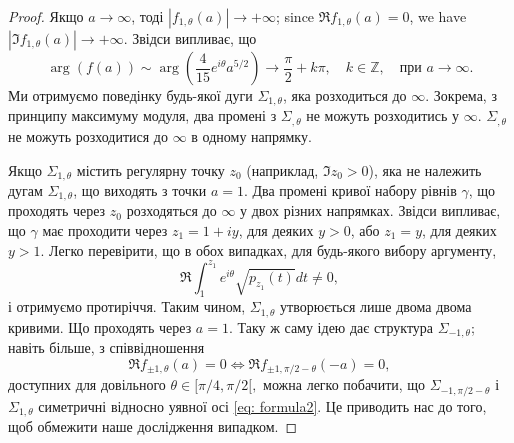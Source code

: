 \documentclass[]{article}
\theoremstyle{plain}
\begin{document}
\begin{proof}
Якщо $a \to \infty$, тоді $|f_{1,\theta}(a)| \to +\infty$; since $\Re f_{1,\theta}(a) = 0$, we have $|\Im f_{1,\theta}(a)| \to +\infty$. Звідси випливає, що
\begin{equation*}
    \arg(f(a)) \sim \arg \left( \frac{4}{15} e^{i\theta} a^{5/2} \right) \to \frac{\pi}{2} + k\pi, \quad k \in \mathbb{Z}, \quad \text{при } a \to \infty. 
\end{equation*}
Ми отримуємо поведінку будь-якої дуги $\Sigma_{1,\theta}$, яка розходиться до $\infty$. Зокрема, з принципу максимуму модуля, два промені з $\Sigma_{,\theta}$ не можуть розходитись у $\infty$. $\Sigma_{,\theta}$ не можуть розходитися до $\infty$ в одному напрямку. 

Якщо $\Sigma_{1,\theta}$ містить регулярну точку $z_0$ (наприклад, $\Im z_0 > 0$), яка не належить дугам $\Sigma_{1,\theta}$, що виходять з точки $a = 1$. Два промені кривої набору рівнів $\gamma$, що проходять через $z_0$ розходяться до $\infty$ у двох різних напрямках. Звідси випливає, що $\gamma$ має проходити через $z_1 = 1 + iy$, для деяких $y > 0$, або $z_1 = y$, для деяких $y > 1$. Легко перевірити, що в обох випадках, для будь-якого вибору аргументу,
\begin{equation*}
    \Re \int_{1}^{z_1} e^{i\theta} \sqrt{p_{z_1}(t)} dt \neq 0,
\end{equation*}
і отримуємо протиріччя. Таким чином, $\Sigma_{1,\theta}$ утворюється лише двома двома кривими. Що проходять через $a = 1$. Таку ж саму ідею дає структура  $\Sigma_{-1,\theta}$; навіть більше, з співвідношення
\begin{equation} \label{eq: formula2}
    \Re f_{\pm 1,\theta}(a) = 0 \iff \Re f_{\pm 1, \pi/2 - \theta}(-a) = 0,
\end{equation}
доступних для довільного $\theta \in [\pi/4, \pi/2 [,$ можна легко побачити, що $\Sigma_{-1, \pi/2 - \theta}$ і $\Sigma_{1, \theta}$ симетричні відносно уявної осі \eqref{eq: formula2}. Це приводить нас до того, щоб обмежити наше дослідження випадком.
\end{proof}
\end{document}
